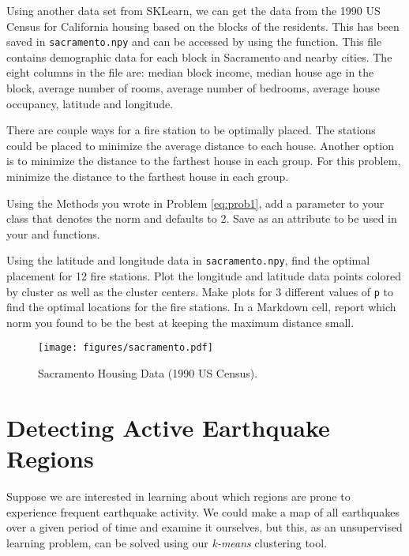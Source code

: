Using another data set from SKLearn, we can get the data from the 1990 US Census for California housing based on the blocks of the residents.
This has been saved in \texttt{sacramento.npy} and can be accessed by using the  function.
This file contains demographic data for each block in Sacramento and nearby cities. 
The eight columns in the file are: median block income, median house age in the block, average number of rooms, average number of bedrooms, average house occupancy, latitude and longitude.

There are couple ways for a fire station to be optimally placed. 
The stations could be placed to minimize the average distance to each house.
Another option is to minimize the distance to the farthest house in each group.
For this problem, minimize the distance to the farthest house in each group.

\begin{problem}
Using the Methods you wrote in Problem \ref{eq:prob1}, add a parameter  to your class that denotes the norm and defaults to 2.
Save  as an attribute to be used in your  and  functions.

Using the latitude and longitude data in \texttt{sacramento.npy}, find the optimal placement for 12 fire stations. 
Plot the longitude and latitude data points colored by cluster as well as the cluster centers.
Make plots for 3 different values of \texttt{p} to find the optimal locations for the fire stations.
In a Markdown cell, report which norm you found to be the best at keeping the maximum distance small.
\label{eq:prob2}
\end{problem}
\begin{figure}[H]
	\centering
	\texttt{[image: figures/sacramento.pdf]}
	\caption{Sacramento Housing Data (1990 US Census).}
	\label{fig:sacramento}
\end{figure}

\section*{Detecting Active Earthquake Regions} %

Suppose we are interested in learning about which regions are prone to experience frequent earthquake activity.
We could make a map of all earthquakes over a given period of time and examine it ourselves, but this, as an unsupervised learning problem, can be solved using our \emph{k-means} clustering tool.

